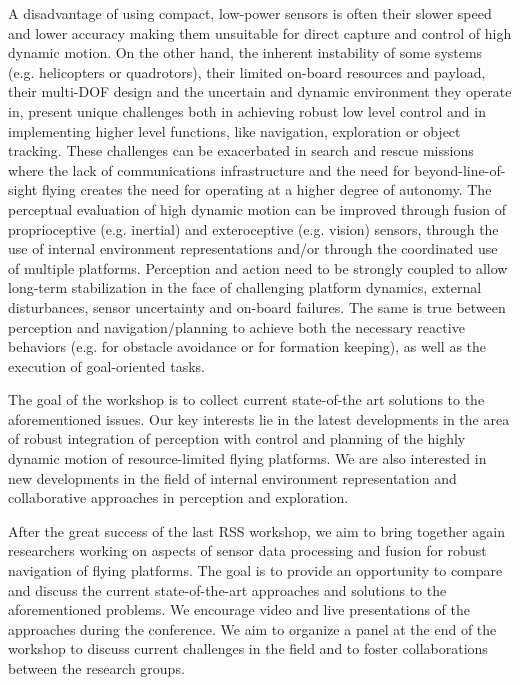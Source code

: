 \begin{spacing}{1.0}
{A disadvantage of using compact, low-power sensors is often their slower speed and lower accuracy making them unsuitable for direct capture and control of high dynamic motion. On the other hand, the inherent instability of some systems (e.g. helicopters or quadrotors), their limited on-board resources and payload, their multi-DOF design and the uncertain and dynamic environment they operate in, present unique challenges both in achieving robust low level control and in implementing higher level functions, like navigation, exploration or object tracking. These challenges can be exacerbated in search and rescue missions where the lack of communications infrastructure and the need for beyond-line-of-sight flying creates the need for operating at a higher degree of autonomy.
\clearpage
The perceptual evaluation of high dynamic motion can be improved through fusion of proprioceptive (e.g. inertial) and exteroceptive (e.g. vision) sensors, through the use of internal environment representations and/or through the coordinated use of multiple platforms. Perception and action need to be strongly coupled to allow long-term stabilization in the face of challenging platform dynamics, external disturbances, sensor uncertainty and on-board failures. The same is true between perception and navigation/planning to achieve both the necessary reactive behaviors (e.g. for obstacle avoidance or for formation keeping), as well as the execution of goal-oriented tasks.

The goal of the workshop is to collect current state-of-the art solutions to the aforementioned issues. Our key interests lie in the latest developments in the area of robust integration of perception with control and planning of the highly dynamic motion of resource-limited flying platforms. We are also interested in new developments in the field of internal environment representation and collaborative approaches in perception and exploration.

After the great success of the last RSS workshop, we aim to bring together again researchers working on aspects of sensor data processing and fusion for robust navigation of flying platforms. The goal is to provide an opportunity to compare and discuss the current state-of-the-art approaches and solutions to the aforementioned problems. We encourage video and live presentations of the approaches during the conference. We aim to organize a panel at the end of the workshop to discuss current challenges in the field and to foster collaborations between the research groups.
}


\end{spacing}
